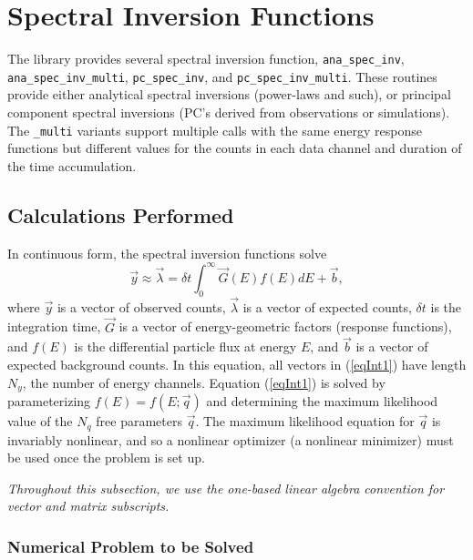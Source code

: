 \documentclass{article}    %
\begin{document}
\section{Spectral Inversion Functions}

The library provides several spectral inversion function,
\verb|ana_spec_inv|, \verb|ana_spec_inv_multi|, \verb|pc_spec_inv|, and \verb|pc_spec_inv_multi|. These
routines provide either analytical spectral inversions (power-laws and
such), or principal component spectral inversions (PC's derived from
observations or simulations). The \verb|_multi| variants support
multiple calls with the same energy response functions but
different values for the counts in each data channel and duration
of the time accumulation.

\subsection{Calculations Performed}

In continuous form, the spectral inversion functions solve
\begin{equation}
\vec{y} \approx \vec{\lambda} = \delta t\int_0^{\infty} \vec{G}(E)f(E)dE + \vec{b}, \label{eqInt1}
\end{equation}
where $\vec{y}$ is a vector of observed counts, $\vec{\lambda}$ is a
vector of expected counts, $\delta t$ is the integration time,
$\vec{G}$ is a vector of energy-geometric factors (response
functions), and $f(E)$ is the differential particle flux at energy
$E$, and $\vec{b}$ is a vector of expected background counts. In this
equation, all vectors in (\ref{eqInt1}) have length $N_y$, the number
of energy channels. Equation (\ref{eqInt1}) is solved by
parameterizing $f(E) = f(E;\vec{q})$ and determining the maximum
likelihood value of the $N_q$ free parameters $\vec{q}$. The maximum
likelihood equation for $\vec{q}$ is invariably nonlinear, and so a
nonlinear optimizer (a nonlinear minimizer) must be used once the
problem is set up.

{\it Throughout this subsection, we use the one-based linear algebra
 convention for vector and matrix subscripts.}

\subsubsection{Numerical Problem to be Solved}
\end{document}
